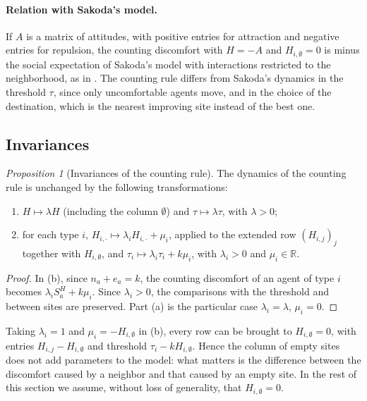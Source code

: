 \documentclass{article}
\theoremstyle{remark}
\newtheorem{proposition}{Proposition}
\begin{document}
\paragraph{Relation with Sakoda's model.} If $A$ is a matrix of attitudes, with positive entries for attraction and negative entries for repulsion, the counting discomfort with $H=-A$ and $H_{i,\emptyset}=0$ is minus the social expectation of Sakoda's model with interactions restricted to the neighborhood, as in \cite{medina2017self,goles2020migration}. The counting rule differs from Sakoda's dynamics in the threshold $\tau$, since only uncomfortable agents move, and in the choice of the destination, which is the nearest improving site instead of the best one.

\subsection{Invariances}

\begin{proposition}[Invariances of the counting rule]\label{prop:invariances}
The dynamics of the counting rule is unchanged by the following transformations:
\begin{enumerate}
    \item[(a)] $H\mapsto\lambda H$ (including the column $\emptyset$) and $\tau\mapsto\lambda\tau$, with $\lambda>0$;
    \item[(b)] for each type $i$, $H_{i,\cdot}\mapsto\lambda_i H_{i,\cdot}+\mu_i$, applied to the extended row $(H_{i,j})_j$ together with $H_{i,\emptyset}$, and $\tau_i\mapsto\lambda_i\tau_i+k\mu_i$, with $\lambda_i>0$ and $\mu_i\in\mathbb R$.
\end{enumerate}
\end{proposition}

\begin{proof}
In (b), since $n_a+e_a=k$, the counting discomfort of an agent of type $i$ becomes $\lambda_i S_a^H+k\mu_i$. Since $\lambda_i>0$, the comparisons with the threshold and between sites are preserved. Part (a) is the particular case $\lambda_i=\lambda$, $\mu_i=0$.
\end{proof}

Taking $\lambda_i=1$ and $\mu_i=-H_{i,\emptyset}$ in (b), every row can be brought to $H_{i,\emptyset}=0$, with entries $H_{i,j}-H_{i,\emptyset}$ and threshold $\tau_i-kH_{i,\emptyset}$. Hence the column of empty sites does not add parameters to the model: what matters is the difference between the discomfort caused by a neighbor and that caused by an empty site. In the rest of this section we assume, without loss of generality, that $H_{i,\emptyset}=0$.
\end{document}
